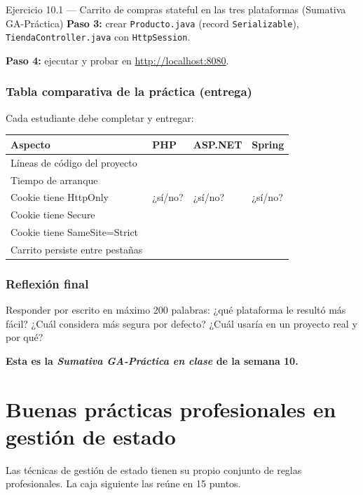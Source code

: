 \documentclass[11pt,a4paper,openany]{book}
\begin{document}
\begin{cajaejercicio}{Ejercicio 10.1 --- Carrito de compras stateful en las tres plataformas (Sumativa GA-Práctica)}
\textbf{Paso 3:} crear \texttt{Producto.java} (record \texttt{Serializable}),
\texttt{TiendaController.java} con \texttt{HttpSession}.

\textbf{Paso 4:} ejecutar y probar en
\url{http://localhost:8080}.

\subsubsection*{Tabla comparativa de la práctica (entrega)}

Cada estudiante debe completar y entregar:

\begin{tabularx}{\textwidth}{lXXX}
\toprule
\textbf{Aspecto} & \textbf{PHP} & \textbf{ASP.NET} & \textbf{Spring}\\
\midrule
Líneas de código del proyecto & & & \\
Tiempo de arranque & & & \\
Cookie tiene HttpOnly & ¿sí/no? & ¿sí/no? & ¿sí/no?\\
Cookie tiene Secure & & & \\
Cookie tiene SameSite=Strict & & & \\
Carrito persiste entre pestañas & & & \\
\bottomrule
\end{tabularx}

\subsubsection*{Reflexión final}

Responder por escrito en máximo 200 palabras: ¿qué plataforma le
resultó más fácil? ¿Cuál considera más segura por defecto? ¿Cuál usaría
en un proyecto real y por qué?

\textbf{Esta es la \emph{Sumativa GA-Práctica en clase} de la semana
10.}
\end{cajaejercicio}

\section{Buenas prácticas profesionales en gestión de estado}

Las técnicas de gestión de estado tienen su propio conjunto
de reglas profesionales. La caja siguiente las reúne en 15 puntos.
\end{document}
